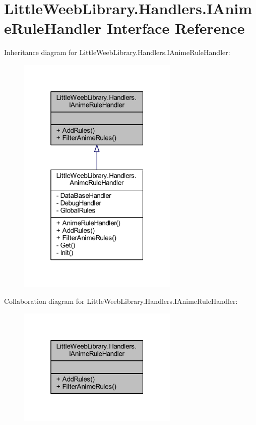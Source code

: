 \hypertarget{interface_little_weeb_library_1_1_handlers_1_1_i_anime_rule_handler}{}\section{Little\+Weeb\+Library.\+Handlers.\+I\+Anime\+Rule\+Handler Interface Reference}
\label{interface_little_weeb_library_1_1_handlers_1_1_i_anime_rule_handler}


Inheritance diagram for Little\+Weeb\+Library.\+Handlers.\+I\+Anime\+Rule\+Handler\+:\nopagebreak
\begin{figure}[H]
\begin{center}
\leavevmode
\includegraphics[width=217pt]{interface_little_weeb_library_1_1_handlers_1_1_i_anime_rule_handler__inherit__graph}
\end{center}
\end{figure}


Collaboration diagram for Little\+Weeb\+Library.\+Handlers.\+I\+Anime\+Rule\+Handler\+:\nopagebreak
\begin{figure}[H]
\begin{center}
\leavevmode
\includegraphics[width=217pt]{interface_little_weeb_library_1_1_handlers_1_1_i_anime_rule_handler__coll__graph}
\end{center}
\end{figure}
